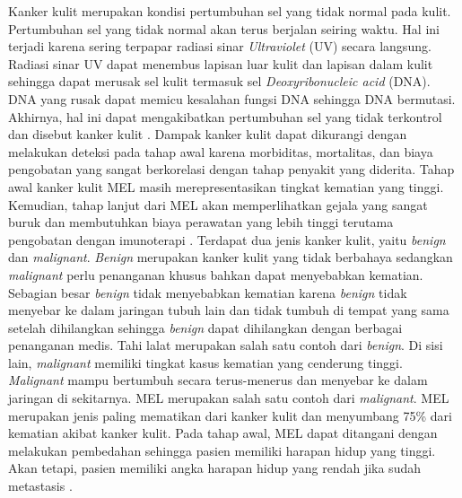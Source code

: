     Kanker kulit merupakan kondisi pertumbuhan sel yang tidak normal pada kulit. Pertumbuhan sel yang tidak normal akan terus berjalan seiring waktu. Hal ini terjadi karena sering terpapar radiasi sinar \textit{Ultraviolet} (UV) secara langsung. Radiasi sinar UV dapat menembus lapisan luar kulit dan lapisan dalam kulit sehingga dapat merusak sel kulit termasuk sel \textit{Deoxyribonucleic acid} (DNA). DNA yang rusak dapat memicu kesalahan fungsi DNA sehingga DNA bermutasi. Akhirnya, hal ini dapat mengakibatkan pertumbuhan sel yang tidak terkontrol dan disebut kanker kulit \citep{Bhimavarapu2022}. Dampak kanker kulit dapat dikurangi dengan melakukan deteksi pada tahap awal karena morbiditas, mortalitas, dan biaya pengobatan yang sangat berkorelasi dengan tahap penyakit yang diderita. Tahap awal kanker kulit MEL masih merepresentasikan tingkat kematian yang tinggi. Kemudian, tahap lanjut dari MEL akan memperlihatkan gejala yang sangat buruk dan membutuhkan biaya perawatan yang lebih tinggi terutama pengobatan dengan imunoterapi \citep{Janda2022}. Terdapat dua jenis kanker kulit, yaitu \textit{benign} dan \textit{malignant}. \textit{Benign} merupakan kanker kulit yang tidak berbahaya sedangkan \textit{malignant} perlu penanganan khusus bahkan dapat menyebabkan kematian. Sebagian besar \textit{benign} tidak menyebabkan kematian karena \textit{benign} tidak menyebar ke dalam jaringan tubuh lain dan tidak tumbuh di tempat yang sama setelah dihilangkan sehingga \textit{benign} dapat dihilangkan dengan berbagai penanganan medis. Tahi lalat merupakan salah satu contoh dari \textit{benign}. Di sisi lain, \textit{malignant} memiliki tingkat kasus kematian yang cenderung tinggi. \textit{Malignant} mampu bertumbuh secara terus-menerus dan menyebar ke dalam jaringan di sekitarnya. MEL merupakan salah satu contoh dari \textit{malignant}. MEL merupakan jenis paling mematikan dari kanker kulit dan menyumbang 75\% dari kematian akibat kanker kulit. Pada tahap awal, MEL dapat ditangani dengan melakukan pembedahan sehingga pasien memiliki harapan hidup yang tinggi. Akan tetapi, pasien memiliki angka harapan hidup yang rendah jika sudah metastasis \citep{Davis2019}.

